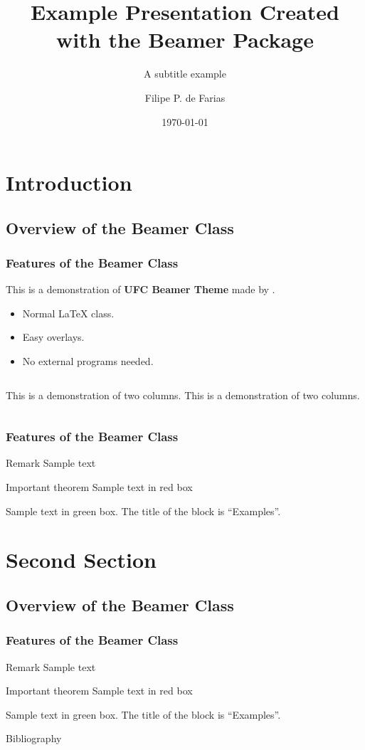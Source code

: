 \documentclass[usenames,dvipsnames,aspectratio=149, 8pt]{beamer}
\title[\textbf{\uppercase{Smaller Title}}]{Example Presentation Created with the Beamer Package}
\subtitle{A subtitle example}
\author[F. P. Farias]{Filipe P. de Farias}
\institute[UFC]{Department of Teleinformatics Engineering\\Universidade Federal do Ceará}
\date{\today}
\begin{document}
\frame{\titlepage}

\section{Introduction}
\subsection{Overview of the Beamer Class}

\frame
{\justifying
\frametitle{Features of the Beamer Class}

This is a demonstration of {\bf\color{UFCOrange}UFC Beamer Theme} made by \insertshortauthor{}.

\begin{itemize}
\item<1-> Normal LaTeX class.
\item<2-> Easy overlays.
\item<3-> No external programs needed.      
\end{itemize}

\begin{columns}
This is a demonstration of two columns.
This is a demonstration of two columns.
\end{columns}
}

\frame
{\frametitle{Features of the Beamer Class}

    \begin{block}{Remark}
    Sample text
    \end{block}
    
    \begin{alertblock}{Important theorem}
    Sample text in red box
    \end{alertblock}
    
    \begin{examples}
    Sample text in green box. The title of the block is ``Examples''.
    \end{examples}

}
\section{Second Section}
\subsection{Overview of the Beamer Class}
\frame
{
  \frametitle{Features of the Beamer Class}

    \begin{block}{Remark}
    Sample text
    \end{block}
    
    \begin{alertblock}{Important theorem}
    Sample text in red box
    \end{alertblock}
    
    \begin{examples}
    Sample text in green box. The title of the block is ``Examples''. \cite{article1}
    \end{examples}

}

\nocite{*}
\begin{frame}[allowframebreaks]{Bibliography}
\printbibliography
\end{frame}
\end{document}
